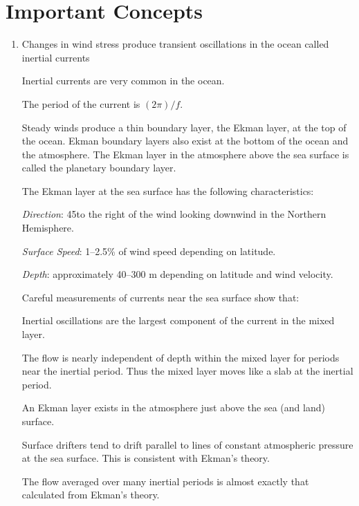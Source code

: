 \section{Important Concepts}
\begin{enumerate}
\item Changes in wind stress
produce transient oscillations in the ocean called inertial
currents
\begin{enumerate}
\vitem Inertial currents are very common in the ocean.

\vitem The period of the current is $(2 \pi)/f$.
\end{enumerate}

\vitem Steady winds produce a thin boundary layer, the Ekman layer, at
the top of the ocean. Ekman boundary layers also exist at the bottom
of the ocean and the atmosphere.  The Ekman layer in the atmosphere
above the sea surface is called the planetary boundary layer.

\vitem The Ekman layer at the sea
surface has the following characteristics:
\begin{enumerate}
\vitem \textit{Direction}: 45\degrees to the right of the wind looking
downwind in the Northern Hemisphere.

\vitem \textit{Surface Speed}: 1--2.5\% of wind speed depending on
latitude.

\vitem \textit{Depth}: approximately 40--300 m depending on latitude
and wind velocity.
\end{enumerate}

\vitem Careful measurements of currents near the sea surface show
that:
\begin{enumerate}
\vitem Inertial oscillations are the largest component of the current
in the mixed layer.

\vitem The flow is nearly independent of depth within the mixed
layer for periods near the inertial
period. Thus the mixed layer moves like a slab
at the inertial period.

\vitem An Ekman layer exists in the atmosphere just above the sea (and
land) surface.

\vitem Surface drifters tend to drift parallel to
lines of constant atmospheric pressure at the sea surface. This is
consistent with Ekman's theory.

\vitem The flow averaged over many inertial periods is almost exactly
that calculated from Ekman's theory.
\end{enumerate}


\end{enumerate}
